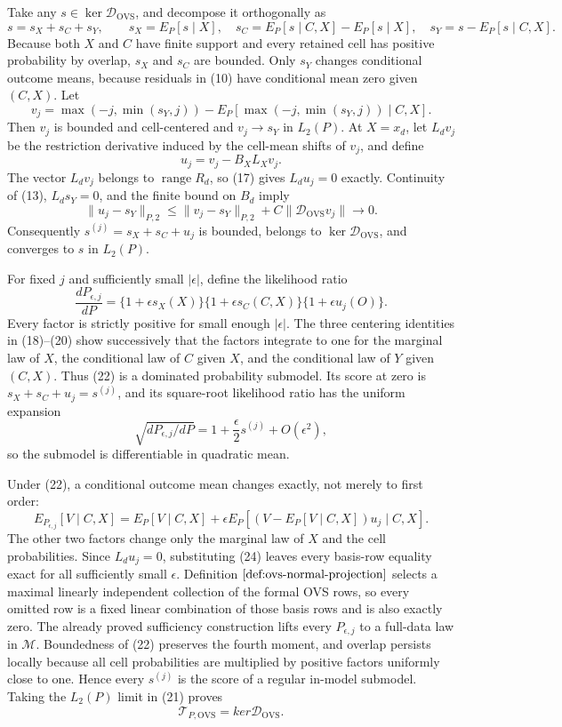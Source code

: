 Take any \(s\in\ker\mathscr D_{\mathrm{OVS}}\), and decompose it orthogonally as
\[
s=s_X+s_C+s_Y,
\qquad
s_X=E_P[s\mid X],
\quad s_C=E_P[s\mid C,X]-E_P[s\mid X],
\quad s_Y=s-E_P[s\mid C,X].
\tag{18}
\]
Because both \(X\) and \(C\) have finite support and every retained cell has positive probability by overlap, \(s_X\) and \(s_C\) are bounded.  Only \(s_Y\) changes conditional outcome means, because residuals in (10) have conditional mean zero given \((C,X)\).  Let
\[
v_j=\max(-j,\min(s_Y,j))
-E_P[\max(-j,\min(s_Y,j))\mid C,X].
\tag{19}
\]
Then \(v_j\) is bounded and cell-centered and \(v_j\to s_Y\) in \(L_2(P)\).  At \(X=x_d\), let \(L_dv_j\) be the restriction derivative induced by the cell-mean shifts of \(v_j\), and define
\[
u_j=v_j-B_XL_Xv_j.
\tag{20}
\]
The vector \(L_dv_j\) belongs to \(\operatorname{range}R_d\), so (17) gives \(L_du_j=0\) exactly.  Continuity of (13), \(L_ds_Y=0\), and the finite bound on \(B_d\) imply
\[
\|u_j-s_Y\|_{P,2}
\le \|v_j-s_Y\|_{P,2}
+C\|\mathscr D_{\mathrm{OVS}}v_j\|
\longrightarrow0.
\tag{21}
\]
Consequently \(s^{(j)}=s_X+s_C+u_j\) is bounded, belongs to \(\ker\mathscr D_{\mathrm{OVS}}\), and converges to \(s\) in \(L_2(P)\).

For fixed \(j\) and sufficiently small \(|\epsilon|\), define the likelihood ratio
\[
\frac{dP_{\epsilon,j}}{dP}
=\{1+\epsilon s_X(X)\}
 \{1+\epsilon s_C(C,X)\}
 \{1+\epsilon u_j(O)\}.
\tag{22}
\]
Every factor is strictly positive for small enough \(|\epsilon|\).  The three centering identities in (18)--(20) show successively that the factors integrate to one for the marginal law of \(X\), the conditional law of \(C\) given \(X\), and the conditional law of \(Y\) given \((C,X)\).  Thus (22) is a dominated probability submodel.  Its score at zero is \(s_X+s_C+u_j=s^{(j)}\), and its square-root likelihood ratio has the uniform expansion
\[
\sqrt{dP_{\epsilon,j}/dP}
=1+\frac{\epsilon}{2}s^{(j)}+O(\epsilon^2),
\tag{23}
\]
so the submodel is differentiable in quadratic mean.

Under (22), a conditional outcome mean changes exactly, not merely to first order:
\[
E_{P_{\epsilon,j}}[V\mid C,X]
=E_P[V\mid C,X]
+\epsilon E_P[(V-E_P[V\mid C,X])u_j\mid C,X].
\tag{24}
\]
The other two factors change only the marginal law of \(X\) and the cell probabilities.  Since \(L_du_j=0\), substituting (24) leaves every basis-row equality exact for all sufficiently small \(\epsilon\).  Definition \(\ref{def:ovs-normal-projection}\) selects a maximal linearly independent collection of the formal OVS rows, so every omitted row is a fixed linear combination of those basis rows and is also exactly zero.  The already proved sufficiency construction lifts every \(P_{\epsilon,j}\) to a full-data law in \(\mathcal M\).  Boundedness of (22) preserves the fourth moment, and overlap persists locally because all cell probabilities are multiplied by positive factors uniformly close to one.  Hence every \(s^{(j)}\) is the score of a regular in-model submodel.  Taking the \(L_2(P)\) limit in (21) proves
\[
\mathcal T_{P,\mathrm{OVS}}=ker\mathscr D_{\mathrm{OVS}}.
\tag{25}
\]

